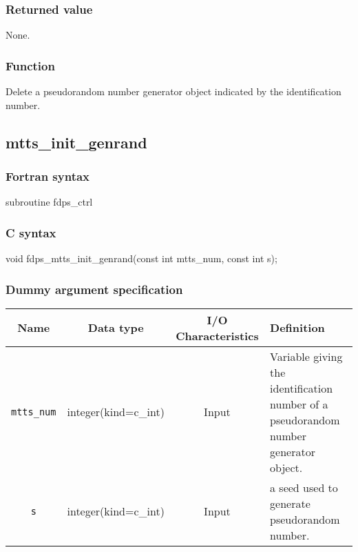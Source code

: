\subsubsection*{Returned value}
None.

\subsubsection*{Function}
Delete a pseudorandom number generator object indicated by the identification number. 
\clearpage

\subsection{mtts\_init\_genrand}
\subsubsection*{Fortran syntax}
\begin{screen}
\begin{spverbatim}  
subroutine fdps_ctrl%
\end{spverbatim}
\end{screen}

\subsubsection*{C syntax}
\begin{screen}
\begin{spverbatim}  
void fdps_mtts_init_genrand(const int mtts_num,
                            const int s);
\end{spverbatim}
\end{screen}

\subsubsection*{Dummy argument specification}
\begin{table}[h]
\begin{tabularx}{\linewidth}{cccX}
\toprule
\rowcolor{Snow2}
Name & Data type & I/O Characteristics & Definition \\
\midrule
\verb|mtts_num| & integer(kind=c\_int) & Input & Variable giving the identification number of a pseudorandom number generator object.\\
\verb|s| & integer(kind=c\_int) & Input & a seed used to generate pseudorandom number.\\
\bottomrule
\end{tabularx}
\end{table}

